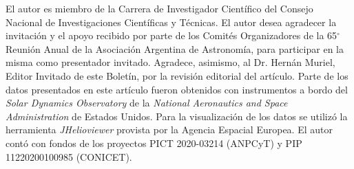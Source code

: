 \documentclass[baaa]{baaa}
\begin{document}
\begin{acknowledgement}
El autor es miembro de la Carrera de Investigador Científico del Consejo Nacional de Investigaciones Científicas y Técnicas. El autor desea agradecer la invitación y el apoyo recibido por parte de los Comités Organizadores de la 65$^{\circ}$ Reunión Anual de la Asociación Argentina de Astronomía, para participar en la misma como presentador invitado. Agradece, asimismo, al Dr. Hernán Muriel, Editor Invitado de este Boletín, por la revisión editorial del artículo. Parte de los datos presentados en este artículo fueron obtenidos con instrumentos a bordo del {\sl Solar Dynamics Observatory} de la {\sl National Aeronautics and Space Administration} de Estados Unidos. Para la visualización de los datos se utilizó la herramienta {\sl JHelioviewer} provista por la Agencia Espacial Europea. El autor contó con fondos de los proyectos PICT 2020-03214 (ANPCyT) y PIP 11220200100985 (CONICET).
\end{acknowledgement}



\small

 
\end{document}
